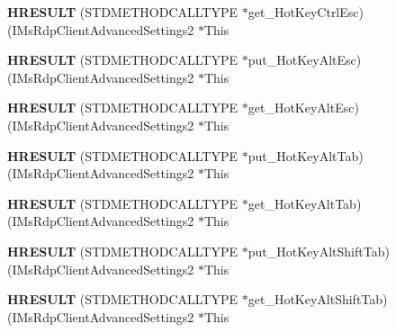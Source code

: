 \begin{DoxyCompactItemize}
{\bfseries H\+R\+E\+S\+U\+LT} (S\+T\+D\+M\+E\+T\+H\+O\+D\+C\+A\+L\+L\+T\+Y\+PE $\ast$get\+\_\+\+Hot\+Key\+Ctrl\+Esc)(I\+Ms\+Rdp\+Client\+Advanced\+Settings2 $\ast$This
\item 
\mbox{\label{struct_i_ms_rdp_client_advanced_settings2_vtbl_a3afd02232257bffb3761e1d5de9c3d6a}} 
{\bfseries H\+R\+E\+S\+U\+LT} (S\+T\+D\+M\+E\+T\+H\+O\+D\+C\+A\+L\+L\+T\+Y\+PE $\ast$put\+\_\+\+Hot\+Key\+Alt\+Esc)(I\+Ms\+Rdp\+Client\+Advanced\+Settings2 $\ast$This
\item 
\mbox{\label{struct_i_ms_rdp_client_advanced_settings2_vtbl_a696f3f039a770546f9084a3314d45915}} 
{\bfseries H\+R\+E\+S\+U\+LT} (S\+T\+D\+M\+E\+T\+H\+O\+D\+C\+A\+L\+L\+T\+Y\+PE $\ast$get\+\_\+\+Hot\+Key\+Alt\+Esc)(I\+Ms\+Rdp\+Client\+Advanced\+Settings2 $\ast$This
\item 
\mbox{\label{struct_i_ms_rdp_client_advanced_settings2_vtbl_a260b3595ee25a774d3cfce340cf03e33}} 
{\bfseries H\+R\+E\+S\+U\+LT} (S\+T\+D\+M\+E\+T\+H\+O\+D\+C\+A\+L\+L\+T\+Y\+PE $\ast$put\+\_\+\+Hot\+Key\+Alt\+Tab)(I\+Ms\+Rdp\+Client\+Advanced\+Settings2 $\ast$This
\item 
\mbox{\label{struct_i_ms_rdp_client_advanced_settings2_vtbl_a20a548d0c84379f03e5af9f5575e6569}} 
{\bfseries H\+R\+E\+S\+U\+LT} (S\+T\+D\+M\+E\+T\+H\+O\+D\+C\+A\+L\+L\+T\+Y\+PE $\ast$get\+\_\+\+Hot\+Key\+Alt\+Tab)(I\+Ms\+Rdp\+Client\+Advanced\+Settings2 $\ast$This
\item 
\mbox{\label{struct_i_ms_rdp_client_advanced_settings2_vtbl_addd7800b45c3510a8b382697eca44497}} 
{\bfseries H\+R\+E\+S\+U\+LT} (S\+T\+D\+M\+E\+T\+H\+O\+D\+C\+A\+L\+L\+T\+Y\+PE $\ast$put\+\_\+\+Hot\+Key\+Alt\+Shift\+Tab)(I\+Ms\+Rdp\+Client\+Advanced\+Settings2 $\ast$This
\item 
\mbox{\label{struct_i_ms_rdp_client_advanced_settings2_vtbl_a8d68f3945f877cb917c52b5a1e95fbc7}} 
{\bfseries H\+R\+E\+S\+U\+LT} (S\+T\+D\+M\+E\+T\+H\+O\+D\+C\+A\+L\+L\+T\+Y\+PE $\ast$get\+\_\+\+Hot\+Key\+Alt\+Shift\+Tab)(I\+Ms\+Rdp\+Client\+Advanced\+Settings2 $\ast$This

\end{DoxyCompactItemize}
